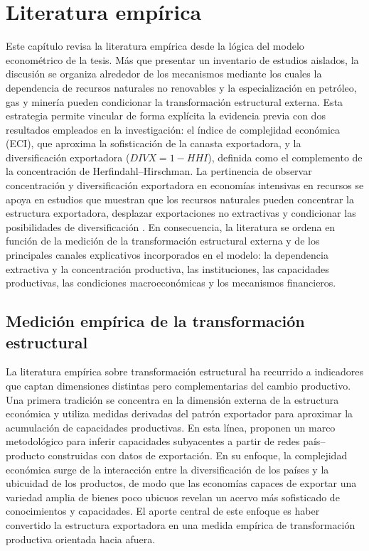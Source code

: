\documentclass[../../PTFM.tex]{subfiles}
\begin{document}
    
    \chapter{Literatura empírica}
	\label{chap:literatura-empirica}
	
	Este capítulo revisa la literatura empírica desde la lógica del modelo econométrico de la tesis. Más que presentar un inventario de estudios aislados, la discusión se organiza alrededor de los mecanismos mediante los cuales la dependencia de recursos naturales no renovables y la especialización en petróleo, gas y minería pueden condicionar la transformación estructural externa. Esta estrategia permite vincular de forma explícita la evidencia previa con dos resultados empleados en la investigación: el índice de complejidad económica (ECI), que aproxima la sofisticación de la canasta exportadora, y la diversificación exportadora ($DIVX=1-HHI$), definida como el complemento de la concentración de Herfindahl--Hirschman. La pertinencia de observar concentración y diversificación exportadora en economías intensivas en recursos se apoya en estudios que muestran que los recursos naturales pueden concentrar la estructura exportadora, desplazar exportaciones no extractivas y condicionar las posibilidades de diversificación \parencite{Harding2016,Bahar2018,Joya2015,Lashitew2021}. En consecuencia, la literatura se ordena en función de la medición de la transformación estructural externa y de los principales canales explicativos incorporados en el modelo: la dependencia extractiva y la concentración productiva, las instituciones, las capacidades productivas, las condiciones macroeconómicas y los mecanismos financieros.
	
	\section{Medición empírica de la transformación estructural}
	\label{sec:medicion-transformacion-estructural}
	
	La literatura empírica sobre transformación estructural ha recurrido a indicadores que captan dimensiones distintas pero complementarias del cambio productivo. Una primera tradición se concentra en la dimensión externa de la estructura económica y utiliza medidas derivadas del patrón exportador para aproximar la acumulación de capacidades productivas. En esta línea, \textcite{Hidalgo2009} proponen un marco metodológico para inferir capacidades subyacentes a partir de redes país--producto construidas con datos de exportación. En su enfoque, la complejidad económica surge de la interacción entre la diversificación de los países y la ubicuidad de los productos, de modo que las economías capaces de exportar una variedad amplia de bienes poco ubicuos revelan un acervo más sofisticado de conocimientos y capacidades. El aporte central de este enfoque es haber convertido la estructura exportadora en una medida empírica de transformación productiva orientada hacia afuera.
	
\end{document}
